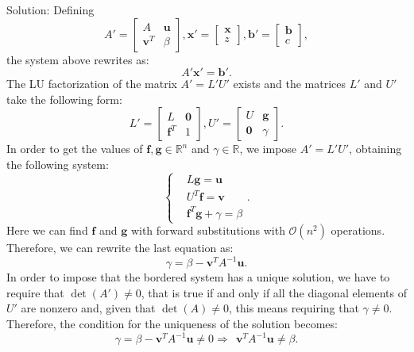 \documentclass[a4paper,11pt]{article}
\newcommand{\R}{\mathbb{R}}
\begin{document}
\noindent Solution: Defining 
\begin{equation}\label{key}
	A' = 
	\begin{bmatrix}
		A &  \textbf{u} \\ 
		\textbf{v}^T & \beta 
	\end{bmatrix}, 
	\textbf{x}' = \begin{bmatrix}
		\textbf{x} \\ 
		z
	\end{bmatrix}, 
	\textbf{b}' = 
	\begin{bmatrix}
		\textbf{b} \\ 
		c
	\end{bmatrix},
\end{equation}
the system above rewrites as:
\begin{equation}\label{key}
	A' \textbf{x}' = \textbf{b}'.
\end{equation}
The LU factorization of the matrix $A' = L' U'$ exists and the matrices $L'$ and $U'$ take the following form:
\begin{equation}\label{key}
	L' = 
	\begin{bmatrix}
		L &  \textbf{0} \\ 
		\textbf{f}^T & 1 
	\end{bmatrix}, 	
	U' = 
	\begin{bmatrix}
		U&  \textbf{g} \\ 
		\textbf{0} & \gamma
	\end{bmatrix}.
\end{equation}
In order to get the values of $\textbf{f}, \textbf{g}\in \R^n$ and $\gamma \in \R$, we impose $ A' = L' U'$, obtaining the following system:
\begin{equation}\label{key}
	\left\lbrace 
	\begin{split}
		& L\textbf{g} = \textbf{u}\\
		& U^T \textbf{f} = \textbf{v}\\
		&\textbf{f}^T \textbf{g} + \gamma = \beta
	\end{split} \right.  .
\end{equation}
Here we can find $\textbf{f}$ and $\textbf{g}$ with forward substitutions with $\mathcal{O}(n^2)$ operations. Therefore, we can rewrite the last equation as:
\begin{equation}\label{key}
	\gamma = \beta - \textbf{v}^T A^{-1} \textbf{u} .
\end{equation}
In order to impose that the bordered system has a unique solution, we have to require that $\det(A') \neq 0$, that is true if and only if all the diagonal elements of $U'$ are nonzero and, given that $\det(A)\neq 0$, this means requiring that $\gamma \neq 0 $. Therefore, the condition for the uniqueness of the solution becomes:
\begin{equation}\label{key}
	\gamma = \beta - \textbf{v}^T A^{-1} \textbf{u} \neq 0 \Rightarrow \ \ \textbf{v}^T A^{-1} \textbf{u} \neq \beta.
\end{equation}
	
\end{document}
